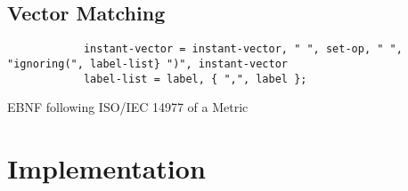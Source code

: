 \subsection{Vector Matching}

\begin{listing}[H]
	\begin{samepage}
		\begin{verbatim}
			instant-vector = instant-vector, " ", set-op, " ", "ignoring(", label-list} ")", instant-vector
			label-list = label, { ",", label };
		\end{verbatim}
		\caption{EBNF following ISO/IEC 14977 of a Metric}
	\end{samepage}
\end{listing}


\clearpage
\section{Implementation}
